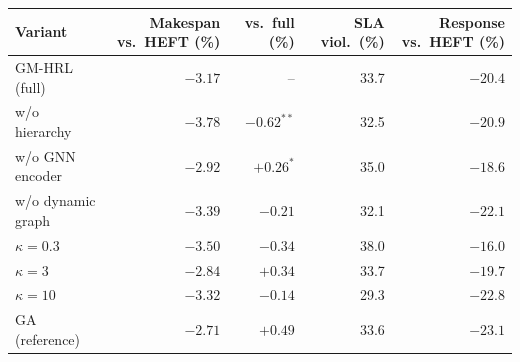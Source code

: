 \begin{tabular}{lrrrr}
\toprule
Variant & Makespan vs.\ HEFT (\%) & vs.\ full (\%) & SLA viol.\ (\%) & Response vs.\ HEFT (\%) \\
\midrule
GM-HRL (full) & $-3.17$ & -- & 33.7 & $-20.4$ \\
w/o hierarchy & $-3.78$ & $-0.62^{**}$ & 32.5 & $-20.9$ \\
w/o GNN encoder & $-2.92$ & $+0.26^{*}$ & 35.0 & $-18.6$ \\
w/o dynamic graph & $-3.39$ & $-0.21$ & 32.1 & $-22.1$ \\
\midrule
$\kappa=0.3$ & $-3.50$ & $-0.34$ & 38.0 & $-16.0$ \\
$\kappa=3$ & $-2.84$ & $+0.34$ & 33.7 & $-19.7$ \\
$\kappa=10$ & $-3.32$ & $-0.14$ & 29.3 & $-22.8$ \\
GA (reference) & $-2.71$ & $+0.49$ & 33.6 & $-23.1$ \\
\bottomrule
\end{tabular}
